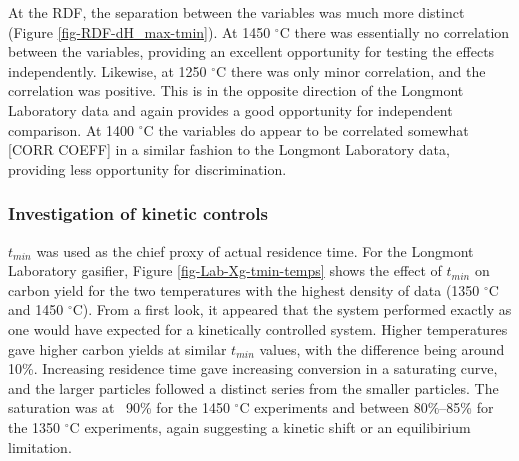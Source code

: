 \documentclass[11pt,twocolumn]{article}
\begin{document}
At the RDF, the separation between the variables was much more distinct (Figure \ref{fig-RDF-dH_max-tmin}).  At 1450 $^{\circ}$C there was essentially no correlation between the variables, providing an excellent opportunity for testing the effects independently.  Likewise, at 1250 $^{\circ}$C there was only minor correlation, and the correlation was positive.  This is in the opposite direction of the Longmont Laboratory data and again provides a good opportunity for independent comparison.  At 1400 $^{\circ}$C the variables do appear to be correlated somewhat [CORR COEFF] in a similar fashion to the Longmont Laboratory data, providing less opportunity for discrimination.

\subsubsection*{Investigation of kinetic controls}

$t_{min}$ was used as the chief proxy of actual residence time.  For the Longmont Laboratory gasifier, Figure \ref{fig-Lab-Xg-tmin-temps} shows the effect of $t_{min}$ on carbon yield for the two temperatures with the highest density of data (1350 $^{\circ}$C and 1450 $^{\circ}$C).  From a first look, it appeared that the system performed exactly as one would have expected for a kinetically controlled system.  Higher temperatures gave higher carbon yields at similar $t_{min}$ values, with the difference being around 10\%.  Increasing residence time gave increasing conversion in a saturating curve, and the larger particles followed a distinct series from the smaller particles.  The saturation was at ~90\% for the 1450 $^{\circ}$C experiments and between 80\%--85\% for the 1350 $^{\circ}$C experiments, again suggesting a kinetic shift or an equilibirium limitation.
\end{document}
